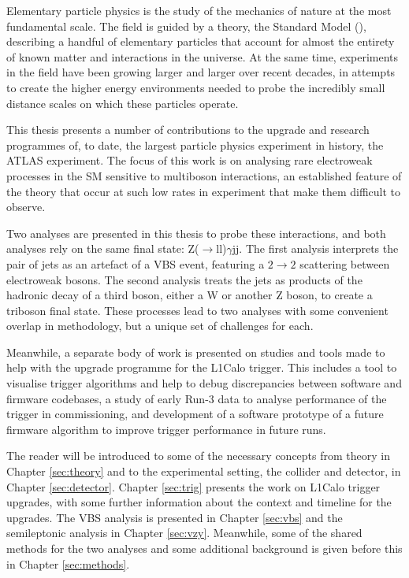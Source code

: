 Elementary particle physics is the study of the mechanics of nature at the most
fundamental scale. The field is guided by a theory, the Standard Model
(), describing a handful of elementary particles that account for almost
the entirety of known matter and interactions in the universe. At the same time,
experiments in the field have been growing larger and larger over recent
decades, in attempts to create the higher energy environments needed to probe
the incredibly small distance scales on which these particles operate.

This thesis presents a number of contributions to the upgrade and research
programmes of, to date, the largest particle physics experiment in history, the
\ac{ATLAS} experiment. The focus of this work is on analysing rare electroweak
processes in the \ac{SM} sensitive to multiboson interactions, an established
feature of the theory that occur at such low rates in experiment that make them
difficult to observe.

Two analyses are presented in this thesis to probe these interactions, and both
analyses rely on the same final state: Z($\to$ll)$\gamma$jj. The first analysis
interprets the pair of jets as an artefact of a \ac{VBS} event, featuring a
$2\to2$ scattering between electroweak bosons. The second analysis treats the
jets as products of the hadronic decay of a third boson, either a W or another Z
boson, to create a triboson final state. These processes lead to two analyses
with some convenient overlap in methodology, but a unique set of challenges for
each.

Meanwhile, a separate body of work is presented on studies and tools made to
help with the upgrade programme for the \ac{L1Calo} trigger. This includes a
tool to visualise trigger algorithms and help to debug discrepancies between
software and firmware codebases, a study of early Run-3 data to analyse
performance of the trigger in commissioning, and development of a software
prototype of a future firmware algorithm to improve trigger performance in
future runs.

The reader will be introduced to some of the necessary concepts from theory in
Chapter \ref{sec:theory} and to the experimental setting, the collider and
detector, in Chapter \ref{sec:detector}. Chapter \ref{sec:trig} presents the
work on \ac{L1Calo} trigger upgrades, with some further information about the
context and timeline for the upgrades. The \ac{VBS} \Zy analysis is presented in
Chapter \ref{sec:vbs} and the semileptonic \VZy analysis in Chapter
\ref{sec:vzy}.  Meanwhile, some of the shared methods for the two analyses and
some additional background is given before this in Chapter \ref{sec:methods}.
